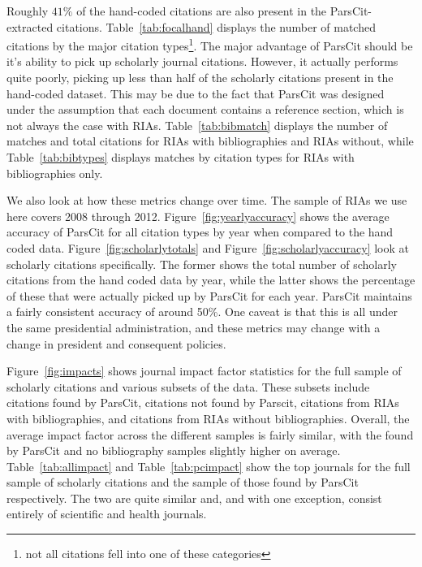 \documentclass[12pt]{article}
\begin{document}
Roughly $41\%$ of the hand-coded citations are also present in the ParsCit-extracted citations. Table~\ref{tab:focalhand} displays the number of matched citations by the major citation types\footnote{not all citations fell into one of these categories}. The major advantage of ParsCit should be it's ability to pick up scholarly journal citations. However, it actually performs quite poorly, picking up less than half of the scholarly citations present in the hand-coded dataset. This may be due to the fact that ParsCit was designed under the assumption that each document contains a reference section, which is not always the case with RIAs. Table~\ref{tab:bibmatch} displays the number of matches and total citations for RIAs with bibliographies and RIAs without, while Table~\ref{tab:bibtypes} displays matches by citation types for RIAs with bibliographies only.

We also look at how these metrics change over time. The sample of RIAs we use here covers 2008 through 2012. Figure~\ref{fig:yearlyaccuracy} shows the average accuracy of ParsCit for all citation types by year when compared to the hand coded data. Figure~\ref{fig:scholarlytotals} and Figure~\ref{fig:scholarlyaccuracy} look at scholarly citations specifically. The former shows the total number of scholarly citations from the hand coded data by year, while the latter shows the percentage of these that were actually picked up by ParsCit for each year. ParsCit maintains a fairly consistent accuracy of around 50\%. One caveat is that this is all under the same presidential administration, and these metrics may change with a change in president and consequent policies.

Figure~\ref{fig:impacts} shows journal impact factor statistics for the full sample of scholarly citations and various subsets of the data. These subsets include citations found by ParsCit, citations not found by Parscit, citations from RIAs with bibliographies, and citations from RIAs without bibliographies. Overall, the average impact factor across the different samples is fairly similar, with the found by ParsCit and no bibliography samples slightly higher on average. Table~\ref{tab:allimpact} and Table~\ref{tab:pcimpact} show the top journals for the full sample of scholarly citations and the sample of those found by ParsCit respectively. The two are quite similar and, and with one exception, consist entirely of scientific and health journals. \\
\end{document}
